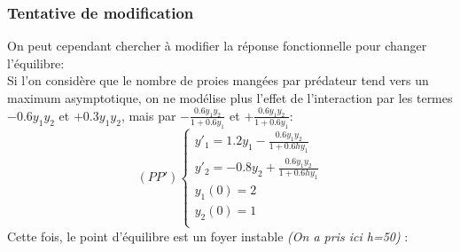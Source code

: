 \documentclass[a4paper,12pt,landscape]{article}
\begin{document}
\subsubsection{Tentative de modification}
On peut cependant chercher à modifier la réponse fonctionnelle pour changer l'équilibre:\\
Si l'on considère que le nombre de proies mangées par prédateur tend vers un maximum asymptotique, on ne modélise plus l'effet de l'interaction par les termes  $-0.6y_1y_2$ et $+0.3y_1y_2$, mais par $-\frac{0.6y_1y_2}{1+0.6y_1}$ et $+\frac{0.6y_1y_2}{1+0.6y_1}$:
$$
(PP')
\left \{
\begin{array}{l}
	y'_1=1.2y_1-\frac{0.6y_1y_2}{1+0.6hy_1}\\
	y'_2=-0.8y_2+\frac{0.6y_1y_2}{1+0.6hy_1}\\
	y_1(0)=2\\
	y_2(0)=1\\
\end{array}
\right.$$
Cette fois, le point d'équilibre est un foyer instable \textit{(On a pris ici h=50)} :\\
\end{document}
